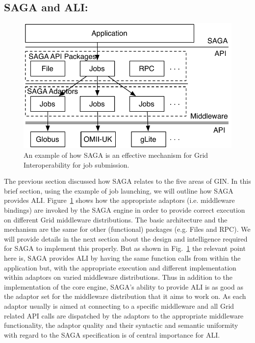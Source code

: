 \documentclass[conference,final]{IEEEtran}
\newcommand{\upup}{\vspace*{-1em}}
\begin{document}
\subsection{SAGA and ALI:}

\begin{figure}
\begin{center}
\includegraphics[scale=0.6]{../diagrams/saga_architecture}
\end{center}
\caption{An example of how SAGA is an effective mechanism for Grid
  Interoperability for job submission.\upup}
\label{fig:saga_arch}
\end{figure}

The previous section discussed how SAGA relates to the five areas of
GIN. In this brief section, using the example of job launching, we
will outline how SAGA provides ALI.  Figure~\ref{fig:saga_arch} shows
how the appropriate adaptors (i.e. middleware bindings) are invoked by
the SAGA engine in order to provide correct execution on different
Grid middleware distributions. The basic architecture and the
mechanism are the same for other (functional) packages (e.g. Files and
RPC). We will provide details in the next section about the design and
intelligence required for SAGA to implement this properly. But as
shown in Fig.~\ref{fig:saga_arch} the relevant point here is, SAGA
provides ALI by having the same function calls from within the
application but, with the appropriate execution and different
implementation within adaptors on varied middleware distributions.
Thus in addition to the implementation of the core engine, SAGA's
ability to provide ALI is as good as the adaptor set for the
middleware distribution that it aims to work on.  As each adaptor
usually is aimed at connecting to a specific middleware and all Grid
related API calls are dispatched by the adaptors to the appropriate
middleware functionality, the adaptor quality and their syntactic and
semantic uniformity with regard to the SAGA specification is of
central importance for ALI.
\end{document}
